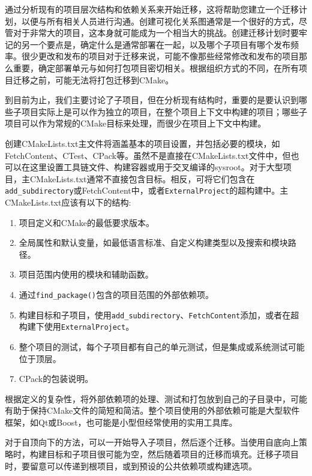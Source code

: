通过分析现有的项目层次结构和依赖关系来开始迁移，这将帮助您建立一个迁移计划，以便与所有相关人员进行沟通。创建可视化关系图通常是一个很好的方式，尽管对于非常大的项目，这本身就可能成为一个相当大的挑战。创建迁移计划时要牢记的另一个要点是，确定什么是通常部署在一起，以及哪个子项目有哪个发布频率。很少更改和发布的项目对于迁移来说，可能不像那些经常修改和发布的项目那么重要，确定部署单元与如何打包项目密切相关。根据组织方式的不同，在所有项目迁移之前，可能无法将打包迁移到CMake。

到目前为止，我们主要讨论了子项目，但在分析现有结构时，重要的是要认识到哪些子项目实际上是可以作为独立的项目，在整个项目上下文中构建的项目；哪些子项目可以作为常规的CMake目标来处理，而很少在项目上下文中构建。

创建CMakeLists.txt主文件将涵盖基本的项目设置，并包括必要的模块，如FetchContent、CTest、CPack等。虽然不是直接在CMakeLists.txt文件中，但也可以在这里设置工具链文件、构建容器或用于交叉编译的sysroot。对于大型项目，主CMakeLists.txt通常不直接包含目标。相反，可将它们包含在\texttt{add\_subdirectory}或FetchContent中，或者\texttt{ExternalProject}的超构建中。主CMakeLists.txt应该有以下的结构:

\begin{enumerate}
\item 
项目定义和CMake的最低要求版本。

\item
全局属性和默认变量，如最低语言标准、自定义构建类型以及搜索和模块路径。

\item
项目范围内使用的模块和辅助函数。

\item
通过\texttt{find\_package()}包含的项目范围的外部依赖项。

\item
构建目标和子项目，使用\texttt{add\_subdirectory}、\texttt{FetchContent}添加，或者在超构建下使用\texttt{ExternalProject}。

\item
整个项目的测试，每个子项目都有自己的单元测试，但是集成或系统测试可能位于顶层。

\item
CPack的包装说明。
\end{enumerate}

根据定义的复杂性，将外部依赖项的处理、测试和打包放到自己的子目录中，可能有助于保持CMake文件的简短和简洁。整个项目使用的外部依赖可能是大型软件框架，如Qt或Boost，也可能是小型但经常使用的实用工具库。

对于自顶向下的方法，可以一开始导入子项目，然后逐个迁移。当使用自底向上策略时，构建目标和子项目很可能为空，然后随着项目的迁移而填充。迁移子项目时，要留意可以传递到根项目，或到预设的公共依赖项或构建选项。

